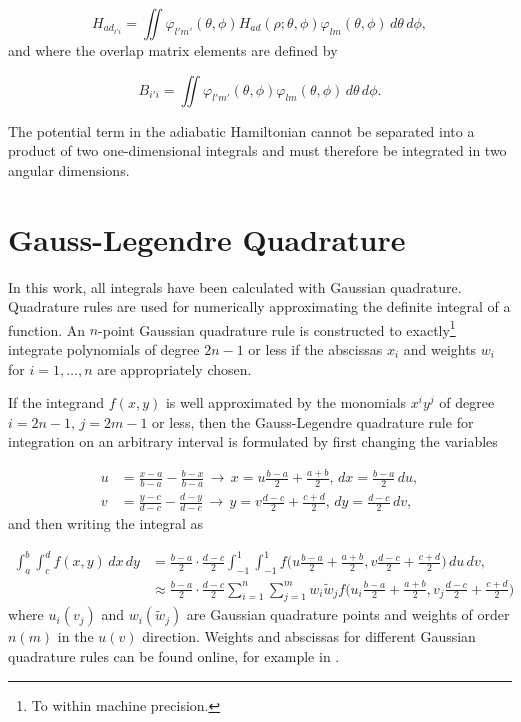 \begin{equation}\label{ham_mat}
H_{ad_{i'i}} = \iint \varphi_{l'm'}(\theta,\phi) H_{ad}(\rho;\theta,\phi)\varphi_{lm}(\theta,\phi) \,d\theta\,d\phi,
\end{equation}
and where the overlap matrix elements are defined by

\begin{equation}\label{over_mat}
B_{i'i} = \iint \varphi_{l'm'}(\theta,\phi)\varphi_{lm}(\theta,\phi)\,d\theta\,d\phi.
\end{equation}

The potential term in the adiabatic Hamiltonian cannot be separated into a product of two one-dimensional integrals and must therefore be integrated in two angular dimensions. 

\section{Gauss-Legendre Quadrature}
In this work, all integrals have been calculated with Gaussian quadrature. Quadrature rules are used for numerically approximating the definite integral of a function. An $n$-point Gaussian quadrature rule is constructed to exactly\footnote{To within machine precision.} integrate polynomials of degree $2n-1$ or less if the abscissas $x_i$ and weights $w_i$ for $i=1,\ldots,n$ are appropriately chosen. 

If the integrand $f(x,y)$ is well approximated by the monomials $x^{i}y^{j}$ of degree $i = 2n-1, \, j = 2m-1$ or less, then the Gauss-Legendre quadrature rule for integration on an arbitrary interval is formulated by first changing the variables

\begin{equation}
\begin{aligned}
u &= \frac{x-a}{b-a} - \frac{b-x}{b-a} \, \rightarrow \, x= u\frac{b-a}{2}+\frac{a+b}{2}, \,dx=\frac{b-a}{2}\,du, \\
v &= \frac{y-c}{d-c} - \frac{d-y}{d-c} \, \rightarrow \, y= v\frac{d-c}{2}+\frac{c+d}{2}, \,dy=\frac{d-c}{2}\,dv,
\end{aligned}
\end{equation} 
and then writing the integral as

\begin{equation}
\begin{aligned}
\int_{a}^{b} \int_{c}^{d}f(x,y) \,dx\,dy &= \frac{b-a}{2} \cdot \frac{d-c}{2} \int_{-1}^{1} \int_{-1}^{1}f \bigg( u\frac{b-a}{2} + \frac{a+b}{2},v\frac{d-c}{2} + \frac{c+d}{2} \bigg) \,du\,dv,\\
&\approx \frac{b-a}{2} \cdot \frac{d-c}{2} \sum_{i=1}^{n}\sum_{j=1}^{m}w_i \tilde{w}_j f\bigg( u_i\frac{b-a}{2} + \frac{a+b}{2},v_j\frac{d-c}{2} + \frac{c+d}{2}\bigg)
\end{aligned}
\end{equation}
where $u_i (v_j)$ and $w_i (\tilde{w}_j)$ are Gaussian quadrature points and weights of order $n (m)$ in the $u (v)$ direction. Weights and abscissas for different Gaussian quadrature rules can be found online, for example in \cite{NumericalRecipes}.

